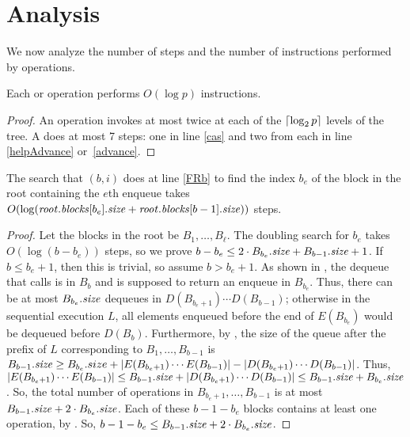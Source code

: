 
\section{Analysis}
We now analyze the number of steps and the number of  instructions performed by operations.

\begin{proposition}\label{casbound}
Each  or  operation performs $O(\log p)$  instructions.
\end{proposition}
\begin{proof}
An operation invokes  at most twice at each of the $\lceil \log_2 p \rceil$ levels of the tree.
A  does at most 7  steps: one in line \ref{cas} and two from each  in line \ref{helpAdvance} or~\ref{advance}.
\end{proof}



\begin{lemma}\label{dSearchTime}
The search that $(b,i)$ does at line \ref{FRb} to find the index $b_e$ of the block in the root containing the $e$th enqueue takes $O(\log (\mbox{\textnormal{\textit{root}}}.\mbox{\textit{blocks}}[b_e].\mbox{\textit{size}} + \mbox{\textnormal{\textit{root}}}.\mbox{\textit{blocks}}[b-1].\mbox{\textit{size}}))$ steps.
\end{lemma}
\begin{proof}
Let the blocks in the root be $B_1, \ldots, B_\ell$.
The doubling search for $b_e$ takes $O(\log (b-b_e))$ steps,
so we prove $b - b_e \leq 2 \cdot B_{b_e}.\mbox{\textit{size}} + B_{b-1}.\mbox{\textit{size}} + 1$.
If $b \leq b_e+1$, then this is trivial, so assume  $b>b_e+1$.
%
As shown in , the dequeue that calls  is in $B_b$ and is supposed to return an enqueue in $B_{b_e}$.
Thus, there can be at most $B_{b_e}.\mbox{\textit{size}}$ dequeues in 
$D(B_{b_e+1}) \cdots D(B_{b-1})$; otherwise in the sequential execution $L$,
all elements enqueued before the end of
$E(B_{b_e})$ would be dequeued before $D(B_b)$. 
Furthermore, by , the size of the queue  after the prefix of $L$ corresponding to 
$B_1,\ldots,B_{b-1}$  is 
$B_{b-1}.\mbox{\textit{size}} \geq B_{b_e}.size + |E(B_{b_e+1})\cdots E(B_{b-1})| - |D(B_{b_e+1})\cdots D(B_{b-1})|$.
Thus, $|E(B_{b_e+1})\cdots E(B_{b-1})| \leq B_{b-1}.\mbox{\textit{size}} + |D(B_{b_e+1})\cdots D(B_{b-1})| \leq B_{b-1}.\mbox{\textit{size}} + B_{b_e}.\mbox{\textit{size}}$.
So, the total number of operations in $B_{b_e+1}, \ldots, B_{b-1}$ is at most
$B_{b-1}.\mbox{\textit{size}} + 2\cdot B_{b_e}.\mbox{\textit{size}}$.
Each of these $b-1-b_e$ blocks contains at least one operation, by .
So, $b-1-b_e \leq B_{b-1}.\mbox{\textit{size}} + 2\cdot B_{b_e}.\mbox{\textit{size}}$.
\end{proof}

